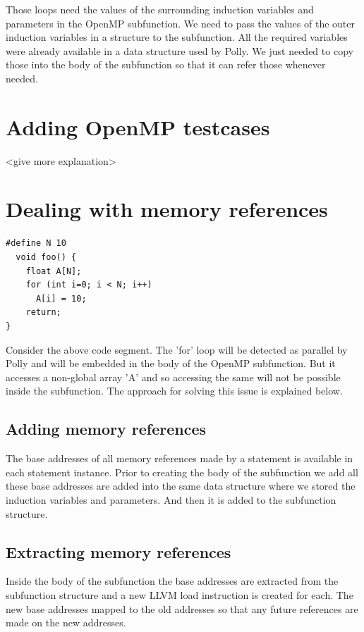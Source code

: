 Those loops need the values of the surrounding induction variables and parameters in the OpenMP subfunction. We need
to pass the values of the outer induction variables in a structure to the subfunction. All the required variables
were already available in a data structure used by Polly. We just needed to copy those into the body of the subfunction
so that it can refer those whenever needed.

\section{Adding OpenMP testcases}

<give more explanation>

\section{Dealing with memory references}

\begin{lstlisting}
#define N 10
  void foo() {
    float A[N];
    for (int i=0; i < N; i++)
      A[i] = 10;
    return;
}
\end{lstlisting}

Consider the above code segment. The 'for' loop will be detected as parallel by Polly and will be embedded in the
body of the OpenMP subfunction. But it accesses a non-global array 'A' and so accessing the same will not be possible inside
the subfunction. The approach for solving this issue is explained below.

\subsection{Adding memory references}

The base addresses of all memory references made by a statement is available in each statement instance. Prior to creating the body
of the subfunction we add all these base addresses are added into the same data structure where we stored the induction variables and parameters.
And then it is added to the subfunction structure.

\subsection{Extracting memory references}

Inside the body of the subfunction the base addresses are extracted from the subfunction structure and a new LLVM load instruction is created for each. The
new base addresses mapped to the old addresses so that any future references are made on the new addresses.

